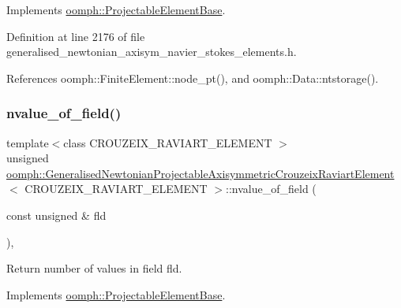 Implements \hyperlink{classoomph_1_1ProjectableElementBase_ac6790f394630b964663281f8740f43a5}{oomph\+::\+Projectable\+Element\+Base}.



Definition at line 2176 of file generalised\+\_\+newtonian\+\_\+axisym\+\_\+navier\+\_\+stokes\+\_\+elements.\+h.



References oomph\+::\+Finite\+Element\+::node\+\_\+pt(), and oomph\+::\+Data\+::ntstorage().

\mbox{\label{classoomph_1_1GeneralisedNewtonianProjectableAxisymmetricCrouzeixRaviartElement_a34ceec9cc38743a2f9a106a106e4cd86}} 
\subsubsection{\texorpdfstring{nvalue\+\_\+of\+\_\+field()}{nvalue\_of\_field()}}
{\footnotesize\ttfamily template$<$class C\+R\+O\+U\+Z\+E\+I\+X\+\_\+\+R\+A\+V\+I\+A\+R\+T\+\_\+\+E\+L\+E\+M\+E\+NT $>$ \\
unsigned \hyperlink{classoomph_1_1GeneralisedNewtonianProjectableAxisymmetricCrouzeixRaviartElement}{oomph\+::\+Generalised\+Newtonian\+Projectable\+Axisymmetric\+Crouzeix\+Raviart\+Element}$<$ C\+R\+O\+U\+Z\+E\+I\+X\+\_\+\+R\+A\+V\+I\+A\+R\+T\+\_\+\+E\+L\+E\+M\+E\+NT $>$\+::nvalue\+\_\+of\+\_\+field (\begin{DoxyParamCaption}\item[{const unsigned \&}]{fld }\end{DoxyParamCaption})\hspace{0.3cm}{\ttfamily [inline]}, {\ttfamily [virtual]}}



Return number of values in field fld. 



Implements \hyperlink{classoomph_1_1ProjectableElementBase_a1a9a6de16f3511bca8e8be770abb9c2e}{oomph\+::\+Projectable\+Element\+Base}.



